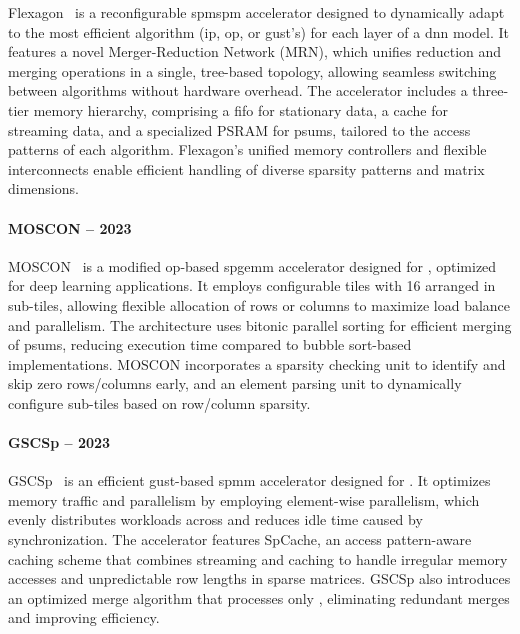 Flexagon~\cite{Munoz-Martinez2023_Flexagon} is a reconfigurable \acrshort{spmspm} accelerator designed to dynamically adapt to the most efficient algorithm (\acrlong{ip}, \acrlong{op}, or \acrlong{gust}'s) for each layer of a \acrshort{dnn} model.
It features a novel Merger-Reduction Network (MRN), which unifies \gls{reduction} and merging operations in a single, tree-based topology, allowing seamless switching between algorithms without hardware overhead.
The accelerator includes a three-tier memory hierarchy, comprising a \acrshort{fifo} for stationary data, a cache for streaming data, and a specialized PSRAM for \glspl{psum}, tailored to the access patterns of each algorithm.
Flexagon's unified memory controllers and flexible interconnects enable efficient handling of diverse sparsity patterns and matrix dimensions.

\paragraph{MOSCON -- 2023}

MOSCON~\cite{Noble2023_MOSCON} is a modified \acrlong{op}-based \acrshort{spgemm} accelerator designed for , optimized for deep learning applications.
It employs configurable \glspl{tile} with 16  arranged in sub-\glspl{tile}, allowing flexible allocation of rows or columns to maximize load balance and parallelism.
The architecture uses bitonic parallel sorting for efficient merging of \glspl{psum}, reducing execution time compared to bubble sort-based implementations.
MOSCON incorporates a sparsity checking unit to identify and skip zero rows/columns early, and an element parsing unit to dynamically configure sub-\glspl{tile} based on row/column sparsity.

\paragraph{GSCSp -- 2023}

GSCSp~\cite{Li2023_GSCSp} is an efficient \acrlong{gust}-based \acrshort{spmm} accelerator designed for .
It optimizes memory traffic and parallelism by employing element-wise parallelism, which evenly distributes workloads across  and reduces idle time caused by synchronization.
The accelerator features SpCache, an access pattern-aware caching scheme that combines streaming and caching to handle irregular memory accesses and unpredictable row lengths in sparse matrices.
GSCSp also introduces an optimized merge algorithm that processes only , eliminating redundant merges and improving efficiency.


